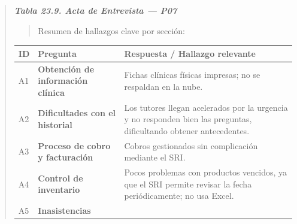 \documentclass[
]{article}
\newcounter{none} %
\begin{document}
\begin{quote}
\protect{}\label{_bookmark_P07_acta}{}\emph{\textbf{Tabla 23.9. Acta de Entrevista --- P07}}

\begin{quote}
Resumen de hallazgos clave por sección:
\end{quote}

{\def\LTcaptype{none} %
\begin{longtable}[]{|
  >{\centering\arraybackslash}p{}|
  >{\raggedright\arraybackslash}p{}|
  >{\raggedright\arraybackslash}p{}|}
\hline
\begin{minipage}[b]{\linewidth}\centering
\textbf{ID}
\end{minipage} & \begin{minipage}[b]{\linewidth}\centering
\textbf{Pregunta}
\end{minipage} & \begin{minipage}[b]{\linewidth}\raggedright
\textbf{Respuesta / Hallazgo relevante}
\end{minipage} \\
\hline
\endhead
\hline
\endlastfoot
A1 & \textbf{Obtención de información clínica} &
\begin{minipage}[t]{\linewidth}\raggedright
Fichas clínicas físicas impresas; no se respaldan en la nube.
\end{minipage} \\
\hline
A2 & \textbf{Dificultades con el historial} &
\begin{minipage}[t]{\linewidth}\raggedright
Los tutores llegan acelerados por la urgencia y no responden bien las preguntas, dificultando obtener antecedentes.
\end{minipage} \\
\hline
A3 & \textbf{Proceso de cobro y facturación} &
\begin{minipage}[t]{\linewidth}\raggedright
Cobros gestionados sin complicación mediante el SRI.
\end{minipage} \\
\hline
A4 & \textbf{Control de inventario} &
\begin{minipage}[t]{\linewidth}\raggedright
Pocos problemas con productos vencidos, ya que el SRI permite revisar la fecha periódicamente; no usa Excel.
\end{minipage} \\
\hline
A5 & \textbf{Inasistencias} &
\begin{minipage}[t]{\linewidth}\raggedright

\end{minipage}
\end{longtable}}
\end{quote}
\end{document}
